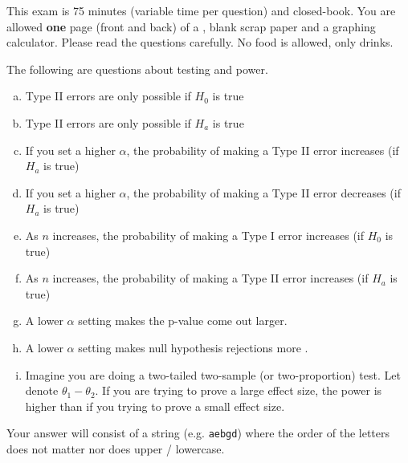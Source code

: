 \documentclass[12pt,landscape]{article}
\newcommand{\instr}{\small Your answer will consist of a string (e.g. \texttt{aebgd}) where the order of the letters does not matter nor does upper / lowercase. \normalsize}
\begin{document}
This exam is 75 minutes (variable time per question) and closed-book. You are allowed \textbf{one} page (front and back) of a , blank scrap paper and a graphing calculator. Please read the questions carefully. No food is allowed, only drinks. %

\pagebreak


\problem{} The following are questions about testing and power.

\vspace{-0.2cm}\benum{} 

\begin{enumerate}[(a)]
\item Type II errors are only possible if $H_0$ is true
\item Type II errors are only possible if $H_a$ is true
\item If you set a higher $\alpha$, the probability of making a Type II error increases (if $H_a$ is true)
\item If you set a higher $\alpha$, the probability of making a Type II error decreases (if $H_a$ is true)
\item As $n$ increases, the probability of making a Type I error increases (if $H_0$ is true)
\item As $n$ increases, the probability of making a Type II error increases (if $H_a$ is true)
\item A lower $\alpha$ setting makes the p-value come out larger.
\item A lower $\alpha$ setting makes null hypothesis rejections more . 


\item Imagine you are doing a two-tailed two-sample (or two-proportion) test. Let  denote $\theta_1 - \theta_2$. If you are trying to prove a large effect size, the power is higher than if you trying to prove a small effect size.
\end{enumerate}
\eenum\instr\pagebreak
\end{document}
